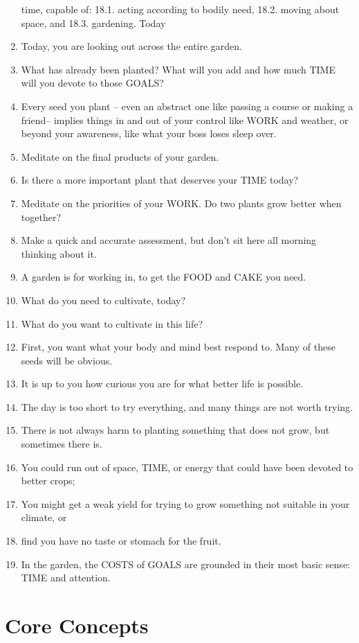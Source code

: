 \documentclass[
]{book}
\begin{document}
\begin{enumerate}
  time, capable of:
  18.1. acting according to bodily need,
  18.2. moving about space, and
  18.3. gardening.
  Today
\item
  Today, you are looking out across the entire garden.
\item
  What has already been planted? What will you add and how much TIME will you
  devote to those GOALS?
\item
  Every seed you plant -- even an abstract one like passing a course or making a
  friend-- implies things in and out of your control like WORK and weather, or
  beyond your awareness, like what your boss loses sleep over.
\item
  Meditate on the final products of your garden.
\item
  Is there a more important plant that deserves your TIME today?
\item
  Meditate on the priorities of your WORK. Do two plants grow better when
  together?
\item
  Make a quick and accurate assessment, but don't sit here all morning thinking
  about it.
\item
  A garden is for working in, to get the FOOD and CAKE you need.
\item
  What do you need to cultivate, today?
\item
  What do you want to cultivate in this life?
\item
  First, you want what your body and mind best respond to. Many of these seeds
  will be obvious.
\item
  It is up to you how curious you are for what better life is possible.
\item
  The day is too short to try everything, and many things are not worth trying.
\item
  There is not always harm to planting something that does not grow, but
  sometimes there is.
\item
  You could run out of space, TIME, or energy that could have been devoted to
  better crops;
\item
  You might get a weak yield for trying to grow something not suitable in your
  climate, or
\item
  find you have no taste or stomach for the fruit.
\item
  In the garden, the COSTS of GOALS are grounded in their most basic sense: TIME
  and attention.
\end{enumerate}

\hypertarget{core-concepts}{%
\section{Core Concepts}\label{core-concepts}}
\end{document}
